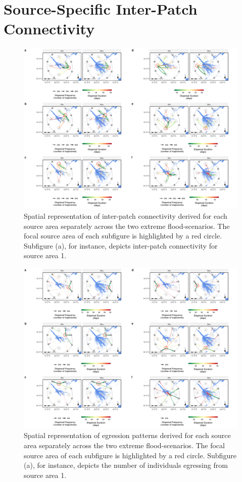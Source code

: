 \documentclass[abstract=on,10pt,a4paper,bibliography=totocnumbered]{article}
\begin{document}
\section{Source-Specific Inter-Patch Connectivity}
\begin{figure}[htbp]
  \begin{center}
  \includegraphics[width = \textwidth]{Figures/IPCMain.png}
  \caption{Spatial representation of inter-patch connectivity derived for each
  source area separately across the two extreme flood-scenarios. The focal
  source area of each subfigure is highlighted by a red circle. Subfigure (a),
  for instance, depicts inter-patch connectivity for source area 1.}
  \label{IPCMain}
  \end{center}
\end{figure}

\newpage
\begin{figure}[htbp]
  \begin{center}
  \includegraphics[width = \textwidth]{Figures/IPCBuffer.png}
  \caption{Spatial representation of egression patterns derived for each
  source area separately across the two extreme flood-scenarios. The focal
  source area of each subfigure is highlighted by a red circle. Subfigure (a),
  for instance, depicts the number of individuals egressing from source area
  1.}
  \label{IPCBuffer}
  \end{center}
\end{figure}
\end{document}
